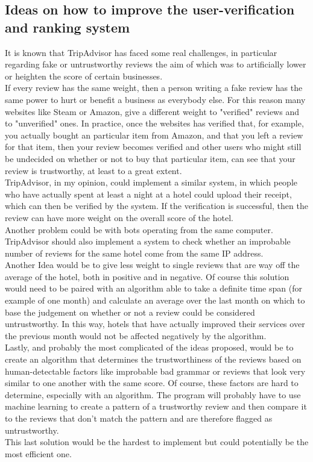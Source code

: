 \documentclass{article}
\begin{document}
	\subsection{Ideas on how to improve the user-verification and ranking system}
	It is known that TripAdvisor has faced some real challenges, in particular regarding fake or untrustworthy reviews the aim of which was to artificially lower or heighten the score of certain businesses.\\
	If every review has the same weight, then a person writing a fake review has the same power to hurt or benefit a business as everybody else. For this reason many websites like Steam or Amazon, give a different weight to "verified" reviews and to "unverified" ones. In practice, once the websites has verified that, for example, you actually bought an particular item from Amazon, and that you left a review for that item, then your review becomes verified and other users who might still be undecided on whether or not to buy that particular item, can see that your review is trustworthy, at least to a great extent.\\
	TripAdvisor, in my opinion, could implement a similar system, in which people who have actually spent at least a night at a hotel could upload their receipt, which can then be verified by the system. If the verification is successful, then the review can have more weight on the overall score of the hotel.\\
	Another problem could be with bots operating from the same computer. TripAdvisor should also implement a system to check whether an improbable number of reviews for the same hotel come from the same IP address.\\
	Another Idea would be to give less weight to single reviews that are way off the average of the hotel, both in positive and in negative. Of course this solution would need to be paired with an algorithm able to take a definite time span (for example of one month) and calculate an average over the last month on which to base the judgement on whether or not a review could be considered untrustworthy. In this way, hotels that have actually improved their services over the previous month would not be affected negatively by the algorithm.\\
	Lastly, and probably the most complicated of the ideas proposed, would be to create an algorithm that determines the trustworthiness of the reviews based on human-detectable factors like improbable bad grammar or reviews that look very similar to one another with the same score. Of course, these factors are hard to determine, especially with an algorithm. The program will probably have to use machine learning to create a pattern of a trustworthy review and then compare it to the reviews that don't match the pattern and are therefore flagged as untrustworthy. \\
	This last solution would be the hardest to implement but could potentially be the most efficient one.
	
\end{document}

